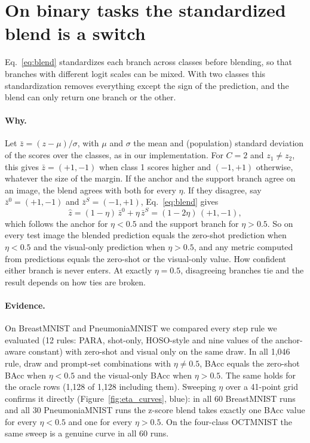 \section{On binary tasks the standardized blend is a switch}\label{sec:finding2}

Eq.~\eqref{eq:blend} standardizes each branch across classes before blending, so that branches with different logit scales can be mixed.
With two classes this standardization removes everything except the sign of the prediction, and the blend can only return one branch or the other.

\paragraph{Why.}
Let $\bar z = (z - \mu)/\sigma$, with $\mu$ and $\sigma$ the mean and (population) standard deviation of the scores over the classes,
as in our implementation.
For $C = 2$ and $z_1 \neq z_2$, this gives $\bar z = (+1, -1)$ when class 1 scores higher and $(-1, +1)$ otherwise,
whatever the size of the margin.
If the anchor and the support branch agree on an image, the blend agrees with both for every $\eta$.
If they disagree, say $\bar z^0 = (+1, -1)$ and $\bar z^S = (-1, +1)$, Eq.~\eqref{eq:blend} gives
\begin{equation}
  \hat z = (1 - \eta)\,\bar z^0 + \eta\,\bar z^S = (1 - 2\eta)\,(+1, -1),
\end{equation}
which follows the anchor for $\eta < 0.5$ and the support branch for $\eta > 0.5$.
So on every test image the blended prediction equals the zero-shot prediction when $\eta < 0.5$ and the visual-only prediction when $\eta > 0.5$,
and any metric computed from predictions equals the zero-shot or the visual-only value.
How confident either branch is never enters.
At exactly $\eta = 0.5$, disagreeing branches tie and the result depends on how ties are broken.

\paragraph{Evidence.}
On BreastMNIST and PneumoniaMNIST we compared every step rule we evaluated (12 rules: PARA, shot-only, HOSO-style and nine values of the anchor-aware constant)
with zero-shot and visual only on the same draw.
In all 1,046 rule, draw and prompt-set combinations with $\eta \neq 0.5$, BAcc equals the zero-shot BAcc when $\eta < 0.5$ and the visual-only BAcc when $\eta > 0.5$.
The same holds for the oracle rows (1,128 of 1,128 including them).
Sweeping $\eta$ over a 41-point grid confirms it directly (Figure~\ref{fig:eta_curves}, blue):
in all 60 BreastMNIST runs and all 30 PneumoniaMNIST runs the z-score blend takes exactly one BAcc value for every $\eta < 0.5$ and one for every $\eta > 0.5$.
On the four-class OCTMNIST the same sweep is a genuine curve in all 60 runs.

